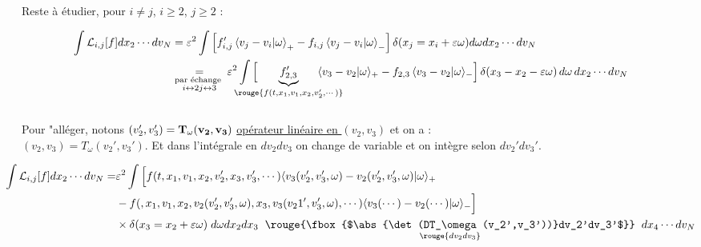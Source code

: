 \documentclass[12pt,a4paper]{article}
\begin{document}
\begin{dem}
		\newpage
		
		 \begin{minipage}[t]{18cm}
		 	Reste à étudier, pour $i \not = j$, $i\geq 2$, $j \geq 2$ :
		 	
		 	\[
		 	\hspace{-1cm}\begin{aligned}
		 		\displaystyle\int \mathcal L_{i,j}[f]dx_2 \cdots dv_N 
		 		& = \varepsilon^2\int \left[f_{i,j}' \left<v_j-v_i|\omega\right>_+- f_{i,j}\left<v_j-v_i|\omega\right>_-\right]\delta(x_j=x_i+\varepsilon\omega)d\omega dx_2 \cdots dv_N \\
		 		& \underset{\substack{\text{par échange }\\ i\leftrightarrow 2 j\leftrightarrow 3}}{=}
		 		\varepsilon^2
		 		\int
		 		\Big[
		 		\hspace{-.8cm}\underbrace{f'_{2,3}}_{\rouge{f(t,x_1,v_1,x_2,v_2',\cdots)}}\hspace{-.8cm}\langle v_3 - v_2 | \omega\rangle_+
		 		-
		 		f_{2,3}\,\langle v_3 - v_2 | \omega\rangle_-
		 		\Big]
		 		\,\delta(x_3 - x_2 - \varepsilon \omega)\,
		 		d\omega\, dx_2 \cdots dv_N
		 	\end{aligned}
		 	\]
		 	 \\
	 	 	
	 	 	Pour "alléger, notons $(v_2',v_3') = \bf{T_\omega(v_2,v_3)}$ \underline{opérateur linéaire en $(v_2,v_3)$} et on a :\\ $(v_2,v_3) = T_\omega(v_2',v_3')$. Et dans l'intégrale en $dv_2dv_3$ on change de variable et on intègre selon $dv_2'dv_3'$.
	 	 	
	 	 	\[
	 	 	\hspace{-1cm}\begin{aligned}
	 	 		\displaystyle\int \mathcal L_{i,j}[f]dx_2 \cdots dv_N 
	 	 		 =& \varepsilon^2\int \Big[f(t,x_1,v_1,x_2,v_2',x_3,v_3',\cdots)\langle v_3(v_2',v_3',\omega)-v_2(v_2',v_3',\omega)|\omega\rangle_+\\
	 	 		 & -f(,x_1,v_1,x_2,v_2(v_2',v_3',\omega),x_3,v_3(v_21',v_3',\omega),\cdots)\langle v_3(\cdots)-v_2(\cdots)|\omega\rangle_-\Big]\\
	 	 		 & \times\delta(x_3=x_2+\varepsilon\omega) \hspace{.1cm} d\omega dx_2dx_3 \hspace{.2cm} \underset{\rouge{dv_2dv_3}}{\rouge{\fbox{$\abs{\det(DT_\omega(v_2',v_3'))}dv_2'dv_3'$}}} \hspace{.2cm} dx_4 \cdots dv_N
	 	 	\end{aligned}
	 	 	\]
	 	 	

\end{minipage}
\end{dem}
\end{document}
